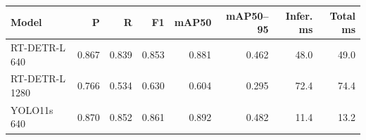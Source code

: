 \begin{tabular}{lrrrrrrr}
\hline
Model & P & R & F1 & mAP50 & mAP50--95 & Infer. ms & Total ms \\
\hline
RT-DETR-L 640 & 0.867 & 0.839 & 0.853 & 0.881 & 0.462 & 48.0 & 49.0 \\
RT-DETR-L 1280 & 0.766 & 0.534 & 0.630 & 0.604 & 0.295 & 72.4 & 74.4 \\
YOLO11s 640 & 0.870 & 0.852 & 0.861 & 0.892 & 0.482 & 11.4 & 13.2 \\
\hline
\end{tabular}

